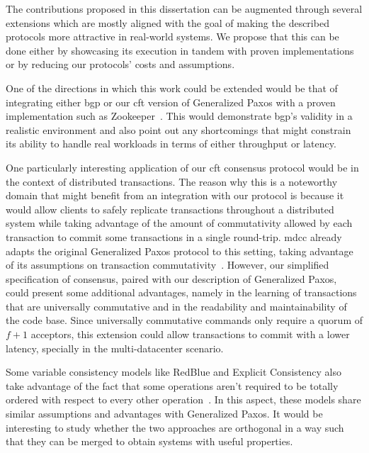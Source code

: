 The contributions proposed in this dissertation can be augmented through several extensions which are mostly aligned with the goal of making the described protocols more attractive in real-world systems. We propose that this can be done either by showcasing its execution in tandem with proven implementations or by reducing our protocols' costs and assumptions.\par
One of the directions in which this work could be extended would be that of integrating either \acrshort{bgp} or our \acrshort{cft} version of Generalized Paxos with a proven implementation such as Zookeeper~\cite{Hunt2010}. This would demonstrate \acrshort{bgp}'s validity in a realistic environment and also point out any shortcomings that might constrain its ability to handle real workloads in terms of either throughput or latency. \par
One particularly interesting application of our \acrshort{cft} consensus protocol would be in the context of distributed transactions. The reason why this is a noteworthy domain that might benefit from an integration with our protocol is because it would allow clients to safely replicate transactions throughout a distributed system while taking advantage of the amount of commutativity allowed by each transaction to commit some transactions in a single round-trip. \acrlong{mdcc} already adapts the original Generalized Paxos protocol to this setting, taking advantage of its assumptions on transaction commutativity~\cite{Kraska2013}. However, our simplified specification of consensus, paired with our description of Generalized Paxos, could present some additional advantages, namely in the learning of transactions that are universally commutative and in the readability and maintainability of the code base. Since universally commutative commands only require a quorum of $f+1$ acceptors, this extension could allow transactions to commit with a lower latency, specially in the multi-datacenter scenario. \par
Some variable consistency models like RedBlue and Explicit Consistency also take advantage of the fact that some operations aren't required to be totally ordered with respect to every other operation~\cite{Li2012,Balegas2015}. In this aspect, these models share similar assumptions and advantages with Generalized Paxos. It would be interesting to study whether the two approaches are orthogonal in a way such that they can be merged to obtain systems with useful properties.
